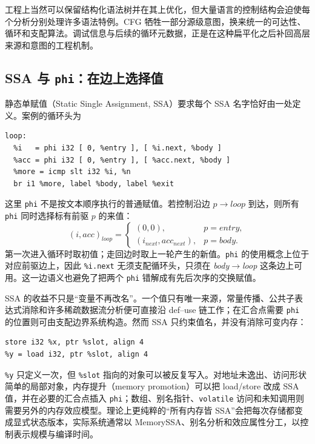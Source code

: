 工程上当然可以保留结构化语法树并在其上优化，但大量语言的控制结构会迫使每个分析分别处理许多语法特例。CFG 牺牲一部分源级意图，换来统一的可达性、循环和支配算法。调试信息与后续的循环元数据，正是在这种扁平化之后补回高层来源和意图的工程机制。

\subsection{SSA 与 \texttt{phi}：在边上选择值}

静态单赋值（Static Single Assignment, SSA）要求每个 SSA 名字恰好由一处定义。案例的循环头为
\begin{lstlisting}[language=LLVMIR,basicstyle=\ttfamily\scriptsize]
loop:
  %i   = phi i32 [ 0, %entry ], [ %i.next, %body ]
  %acc = phi i32 [ 0, %entry ], [ %acc.next, %body ]
  %more = icmp slt i32 %i, %n
  br i1 %more, label %body, label %exit
\end{lstlisting}
这里 \texttt{phi} 不是按文本顺序执行的普通赋值。若控制沿边 \(p\to loop\) 到达，则所有 \texttt{phi} 同时选择标有前驱 \(p\) 的来值：
\[
 (i,acc)_{loop}=
 \begin{cases}
   (0,0), & p=entry,\\
   (i_{next},acc_{next}), & p=body.
 \end{cases}
\]
第一次进入循环时取初值；走回边时取上一轮产生的新值。\texttt{phi} 的使用概念上位于对应前驱边上，因此 \texttt{\%i.next} 无须支配循环头，只须在 \textit{body}\(\to\)\textit{loop} 这条边上可用。这一边语义也避免了把两个 \texttt{phi} 错解成有先后次序的交换赋值。

SSA 的收益不只是“变量不再改名”。一个值只有唯一来源，常量传播、公共子表达式消除和许多稀疏数据流分析便可直接沿 def--use 链工作；在汇合点需要 \texttt{phi} 的位置则可由支配边界系统构造\cite{llvm-cytron1991}。然而 SSA 只约束值名，并没有消除可变内存：
\begin{lstlisting}[language=LLVMIR,basicstyle=\ttfamily\scriptsize]
%slot = alloca i32, align 4
store i32 %x, ptr %slot, align 4
%y = load i32, ptr %slot, align 4
\end{lstlisting}
\texttt{\%y} 只定义一次，但 \texttt{\%slot} 指向的对象可以被反复写入。对地址未逸出、访问形状简单的局部对象，内存提升（memory promotion）可以把 load/store 改成 SSA 值，并在必要的汇合点插入 \texttt{phi}\cite{llvm-passdocs}；数组、别名指针、\texttt{volatile} 访问和未知调用则需要另外的内存效应模型。理论上更纯粹的“所有内存皆 SSA”会把每次存储都变成显式状态版本，实际系统通常以 MemorySSA、别名分析和效应属性分工，以控制表示规模与编译时间。

